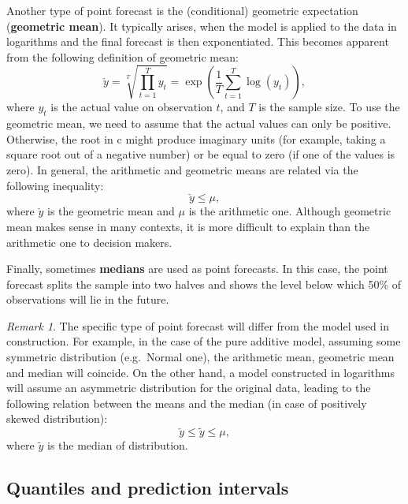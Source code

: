 \documentclass[
]{book}
\theoremstyle{definition}
\theoremstyle{definition}
\theoremstyle{definition}
\theoremstyle{definition}
\theoremstyle{remark}
\newtheorem*{remark}{Remark}
\begin{document}
Another type of point forecast is the (conditional) geometric expectation (\textbf{geometric mean}). It typically arises, when the model is applied to the data in logarithms and the final forecast is then exponentiated. This becomes apparent from the following definition of geometric mean:
\begin{equation}
    \check{y} = \sqrt[T]{\prod_{t=1}^T y_t} = \exp \left(\frac{1}{T} \sum_{t=1}^T \log(y_t) \right) ,
    \label{eq:GeoMean}
\end{equation}
where \(y_t\) is the actual value on observation \(t\), and \(T\) is the sample size. To use the geometric mean, we need to assume that the actual values can only be positive. Otherwise, the root in c might produce imaginary units (for example, taking a square root out of a negative number) or be equal to zero (if one of the values is zero). In general, the arithmetic and geometric means are related via the following inequality:
\begin{equation}
    \check{y} \leq \mu ,
    \label{eq:GeoAndArithMeans}
\end{equation}
where \(\check{y}\) is the geometric mean and \(\mu\) is the arithmetic one. Although geometric mean makes sense in many contexts, it is more difficult to explain than the arithmetic one to decision makers.

Finally, sometimes \textbf{medians} are used as point forecasts. In this case, the point forecast splits the sample into two halves and shows the level below which 50\% of observations will lie in the future.

\begin{remark}
The specific type of point forecast will differ from the model used in construction. For example, in the case of the pure additive model, assuming some symmetric distribution (e.g.~Normal one), the arithmetic mean, geometric mean and median will coincide. On the other hand, a model constructed in logarithms will assume an asymmetric distribution for the original data, leading to the following relation between the means and the median (in case of positively skewed distribution):
\begin{equation}
    \check{y} \leq \tilde{y}\leq \mu ,
    \label{eq:GeoAndArithMeansAndMedian}
\end{equation}
where \(\tilde{y}\) is the median of distribution.
\end{remark}

\hypertarget{typesOfForecastsInterval}{%
\subsection{Quantiles and prediction intervals}\label{typesOfForecastsInterval}}
\end{document}
